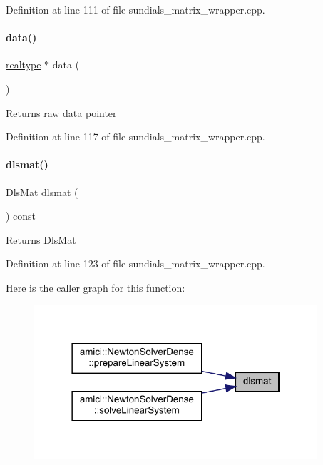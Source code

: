 Definition at line 111 of file sundials\+\_\+matrix\+\_\+wrapper.\+cpp.

\mbox{\label{classamici_1_1_dls_mat_wrapper_ace31bbb9df6dd42f70286108ecafa01b}} 
\paragraph{\texorpdfstring{data()}{data()}}
{\footnotesize\ttfamily \mbox{\hyperlink{namespaceamici_a1bdce28051d6a53868f7ccbf5f2c14a3}{realtype}} $\ast$ data (\begin{DoxyParamCaption}{ }\end{DoxyParamCaption})}

\begin{DoxyReturn}{Returns}
raw data pointer 
\end{DoxyReturn}


Definition at line 117 of file sundials\+\_\+matrix\+\_\+wrapper.\+cpp.

\mbox{\label{classamici_1_1_dls_mat_wrapper_aa1bd2d019ffbf5e652bc0edef4d01552}} 
\paragraph{\texorpdfstring{dlsmat()}{dlsmat()}}
{\footnotesize\ttfamily Dls\+Mat dlsmat (\begin{DoxyParamCaption}{ }\end{DoxyParamCaption}) const}

\begin{DoxyReturn}{Returns}
Dls\+Mat 
\end{DoxyReturn}


Definition at line 123 of file sundials\+\_\+matrix\+\_\+wrapper.\+cpp.

Here is the caller graph for this function\+:
\nopagebreak
\begin{figure}[H]
\begin{center}
\leavevmode
\includegraphics[width=298pt]{classamici_1_1_dls_mat_wrapper_aa1bd2d019ffbf5e652bc0edef4d01552_icgraph}
\end{center}
\end{figure}
